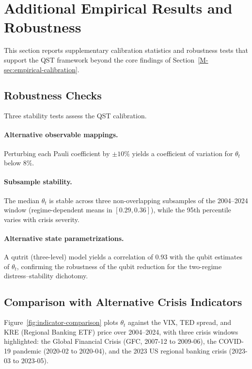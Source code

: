 
\section{Additional Empirical Results and Robustness}\label{sec:additional-results}

This section reports supplementary calibration statistics and robustness tests
that support the QST framework beyond the core findings of
Section~\ref{M-sec:empirical-calibration}.

\subsection{Robustness Checks}\label{sec:robustness-checks}

Three stability tests assess the QST calibration.

\paragraph{Alternative observable mappings.}
Perturbing each Pauli coefficient by $\pm 10\%$ yields a coefficient of variation
for $\theta_t$ below $8\%$.

\paragraph{Subsample stability.}
The median $\theta_t$ is stable across three non-overlapping subsamples of the
2004--2024 window (regime-dependent means in $[0.29, 0.36]$), while the 95th
percentile varies with crisis severity.

\paragraph{Alternative state parametrizations.}
A qutrit (three-level) model yields a correlation of $0.93$ with the qubit
estimates of $\theta_t$, confirming the robustness of the qubit reduction for
the two-regime distress--stability dichotomy.

\subsection{Comparison with Alternative Crisis Indicators}\label{sec:crisis-comparison}

Figure~\ref{fig:indicator-comparison} plots $\theta_t$ against the VIX, TED
spread, and KRE (Regional Banking ETF) price over 2004--2024, with three
crisis windows highlighted: the Global Financial Crisis (GFC, 2007-12 to
2009-06), the COVID-19 pandemic (2020-02 to 2020-04), and the 2023 US regional
banking crisis (2023-03 to 2023-05).

